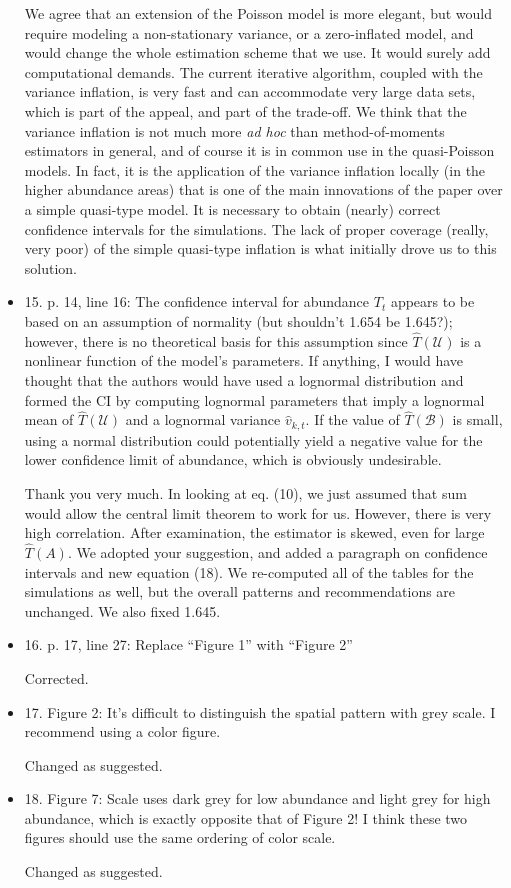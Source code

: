 \documentclass[12pt, titlepage]{article}
\def\cU{\mathcal{U}}
\def\cB{\mathcal{B}}
\begin{document}
\begin{itemize}
  We agree that an extension of the Poisson model is more elegant, but would require modeling a non-stationary variance, or a zero-inflated model, and would change the whole estimation scheme that we use. It would surely add computational demands.  The current iterative algorithm, coupled with the variance inflation, is very fast and can accommodate very large data sets, which is part of the appeal, and part of the trade-off.  We think that the variance inflation is not much more \emph{ad hoc} than method-of-moments estimators in general, and of course it is in common use in the quasi-Poisson models.  In fact, it is the application of the variance inflation locally (in the higher abundance areas) that is one of the main innovations of the paper over a simple quasi-type model.  It is necessary to obtain (nearly) correct confidence intervals for the simulations. The lack of proper coverage (really, very poor) of the simple quasi-type inflation is what initially drove us to this solution.

\item {\color{red!70!black} 15. p. 14, line 16: The confidence interval for abundance $T_t$ appears to be based on an assumption of normality (but shouldn’t 1.654 be 1.645?); however, there is no theoretical basis for this assumption since $\hat{T}(\cU)$ is a nonlinear function of the model’s parameters. If anything, I would have thought that the authors would have used a lognormal distribution and formed the CI by computing lognormal parameters that imply a lognormal mean of $\hat{T}(\cU)$ and a lognormal variance $\hat{v}_{k,t}$. If the value of $\hat{T}(\cB)$ is small, using a normal distribution could potentially yield a negative value for the lower confidence limit of abundance, which is obviously undesirable.}

  Thank you very much. In looking at eq. (10), we just assumed that sum would allow the central limit theorem to work for us.  However, there is very high correlation.  After examination, the estimator is skewed, even for large $\hat{T}(A)$.  We adopted your suggestion, and added a paragraph on confidence intervals and new equation (18).  We re-computed all of the tables for the simulations as well, but the overall patterns and recommendations are unchanged. We also fixed 1.645.

\item {\color{red!70!black} 16. p. 17, line 27: Replace ``Figure 1'' with ``Figure 2'' }

  Corrected.

\item {\color{red!70!black} 17. Figure 2: It's difficult to distinguish the spatial pattern with grey scale. I recommend using a color figure.}

  Changed as suggested.

\item {\color{red!70!black} 18. Figure 7: Scale uses dark grey for low abundance and light grey for high abundance, which is exactly opposite that of Figure 2! I think these two figures should use the same ordering of color scale.}

  Changed as suggested.

\end{itemize}
\end{document}
